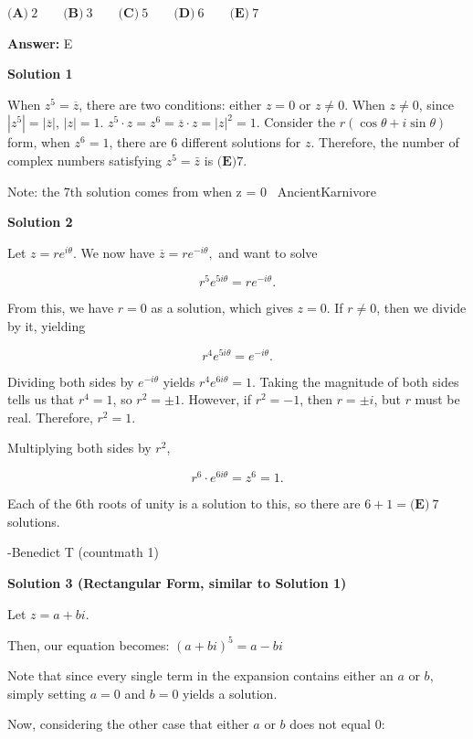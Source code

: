 \begin{enumerate}
 $\textbf{(A)}~2\qquad\textbf{(B)}~3\qquad\textbf{(C)}~5\qquad\textbf{(D)}~6\qquad\textbf{(E)}~7$

 \textbf{Answer: }E



\textbf{Solution 1}

When $z^5=\overline{z}$, there are two conditions: either $z=0$ or $z\neq 0$. When $z\neq 0$, since $|z^5|=|\overline{z}|$, $|z|=1$. $z^5\cdot z=z^6=\overline{z}\cdot z=|z|^2=1$. Consider the $r(\cos \theta +i\sin \theta)$ form, when $z^6=1$, there are 6 different solutions for $z$. Therefore, the number of complex numbers satisfying $z^5=\bar{z}$ is $\boxed{\textbf{(E)} 7}$.

 Note: the 7th solution comes from when z = 0 ~AncientKarnivore

 



\textbf{Solution 2}

Let $z = re^{i\theta}.$ We now have $\overline{z} = re^{-i\theta},$ and want to solve 

 
 \[r^5e^{5i\theta} = re^{-i\theta}.\]

 From this, we have $r = 0$ as a solution, which gives $z = 0$. If $r\neq 0$, then we divide by it, yielding 

 
 \[r^4e^{5i\theta} = e^{-i\theta}.\]

 Dividing both sides by $e^{-i\theta}$ yields $r^4e^{6i\theta} = 1$. Taking the magnitude of both sides tells us that $r^4 = 1$, so $r^2 = \pm 1$. However, if $r^2 = -1$, then $r = \pm i$, but $r$ must be real. Therefore, $r^2 = 1$. 

 Multiplying both sides by $r^2$, 

 
 \[r^6\cdot e^{6i\theta} = z^6 = 1.\]

 Each of the $6$th roots of unity is a solution to this, so there are $6 + 1 = \boxed{\textbf{(E)}\ 7}$ solutions. 

 -Benedict T (countmath 1)

 



\textbf{Solution 3 (Rectangular Form, similar to Solution 1)}

Let $z = a+bi$.

 Then, our equation becomes: $(a+bi)^5=a-bi$

 Note that since every single term in the expansion contains either an $a$ or $b$, simply setting $a=0$ and $b=0$ yields a solution.

 Now, considering the other case that either $a$ or $b$ does not equal $0$:


\end{enumerate}
